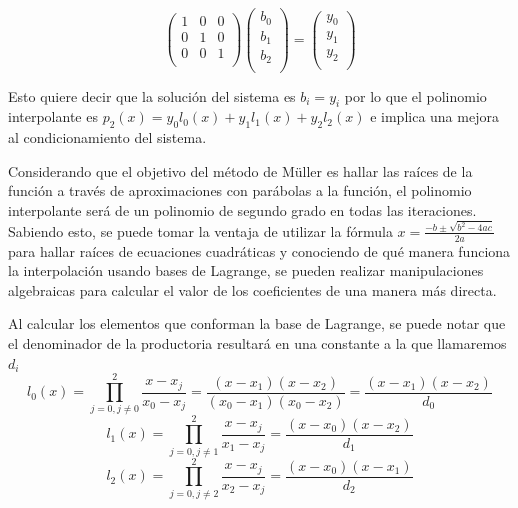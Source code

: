 \documentclass[11pt]{article}
\begin{document}
\begin{equation*}
\begin{pmatrix}
1 & 0 & 0 \\ 
0 & 1 & 0 \\
0 & 0 & 1 \\
\end{pmatrix}
\begin{pmatrix}
b_0 \\ 
b_1 \\
b_2 \\
\end{pmatrix}
=
\begin{pmatrix}
y_0 \\ 
y_1 \\
y_2 \\
\end{pmatrix}
\end{equation*}



Esto quiere decir que la solución del sistema es $b_i = y_i$ por lo que el polinomio interpolante es $p_2(x) = y_0l_0(x) + y_1l_1(x) + y_2l_2(x)$ e implica una mejora al condicionamiento del sistema.

Considerando que el objetivo del método de Müller es hallar las raíces de la función a través de aproximaciones con parábolas a la función, el polinomio interpolante será de un polinomio de segundo grado en todas las iteraciones. Sabiendo esto, se puede tomar la ventaja de utilizar la fórmula $x = \frac{-b \pm \sqrt{b^2 - 4ac}}{2a}$ para hallar raíces de ecuaciones cuadráticas y conociendo de qué manera funciona la interpolación usando bases de Lagrange, se pueden realizar manipulaciones algebraicas para calcular el valor de los coeficientes de una manera más directa.

Al calcular los elementos que conforman la base de Lagrange, se puede notar que el denominador de la productoria resultará en una constante a la que llamaremos $d_i$
$$l_0(x) = \prod_{j=0,j\neq0}^{2} \frac{x-x_j}{x_0 - x_j} =
	    \frac{(x-x_1)(x-x_2)}{(x_0 - x_1)(x_0 - x_2)} =
	     \frac{(x-x_1)(x-x_2)}{d_0}
$$
$$l_1(x)  = \prod_{j=0,j\neq1}^{2} \frac{x-x_j}{x_1 - x_j} = 
	     \frac{(x-x_0)(x-x_2)}{d_1}
$$
$$l_2(x)  = \prod_{j=0,j\neq2}^{2} \frac{x-x_j}{x_2 - x_j} =
	     \frac{(x-x_0)(x-x_1)}{d_2}
$$
\end{document}

